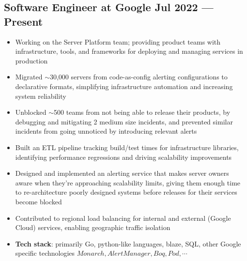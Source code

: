 \documentclass{article}
\begin{document}
\subsection{Software Engineer at Google \hfill Jul 2022 --- Present}
\begin{itemize}
  \itemsep0em
  \item Working on the Server Platform team; providing product teams with infrastructure, tools, and frameworks for deploying and managing services in production
  \item Migrated $\sim$30,000 servers from code-as-config alerting configurations to declarative formats, simplifying infrastructure automation and increasing system reliability %
  \item Unblocked $\sim$500 teams from not being able to release their products, by debugging and mitigating 2 medium size incidents, and prevented similar incidents from going unnoticed by introducing relevant alerts
  \item Built an ETL pipeline tracking build/test times for infrastructure libraries, identifying performance regressions and driving scalability improvements
  \item Designed and implemented an alerting service that makes server owners aware when they're approaching scalability limits, giving them enough time to re-architecture poorly designed systems before releases for their services become blocked
  \item Contributed to regional load balancing for internal and external (Google Cloud) services, enabling geographic traffic isolation
  \item {\bfseries Tech stack}: primarily Go, python-like languages, blaze, SQL, other Google specific technologies \(Monarch, AlertManager, Boq, Pod, \cdots\)
\end{itemize}
\end{document}
